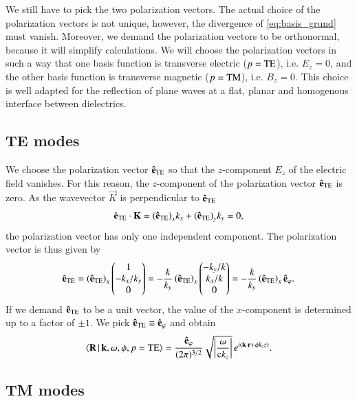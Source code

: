 We still have to pick the two polarization vectors. The actual choice of the
polarization vectors is not unique, however, the divergence of
\eqref{eq:basis_grund} must vanish. Moreover, we demand the polarization
vectors to be orthonormal, because it will simplify calculations. We will
choose the polarization vectors in such a way that one basis function is
transverse electric ($p=\mathrm{TE}$), i.e. $E_z=0$, and the other basis function is
transverse magnetic ($p=\mathrm{TM}$), i.e. $B_z=0$. This choice is well adapted for the
reflection of plane waves at a flat, planar and homogenous interface between
dielectrics.


\subsection{TE modes}

We choose the polarization vector ${\mathbf{\hat e}}_{\mathrm{TE}}$ so that the $z$-component
$E_z$ of the electric field vanishes. For this reason, the $z$-component of the
polarization vector ${\mathbf{\hat e}}_{\mathrm{TE}}$ is zero. As the wavevector $\vec K$ is perpendicular to
${\mathbf{\hat e}}_{\mathrm{TE}}$
\begin{equation}
\hat{{\mathbf{e}}}_{\mathrm{TE}} \cdot{\mathbf{K}} = {\left({\mathbf{\hat e}}_{\mathrm{TE}}\right)}_x k_x + {\left({\mathbf{\hat e}}_{\mathrm{TE}}\right)}_y k_y = 0,
\end{equation}
the polarization vector has only one independent component. The
polarization vector is thus given by
\begin{equation}
\hat{{\mathbf{e}}}_{\mathrm{TE}} = \left({\mathbf{\hat e}}_{\mathrm{TE}}\right)_x \begin{pmatrix} 1 \\ -k_x/k_y \\ 0 \end{pmatrix}
= -\frac{k}{k_y} \left({\mathbf{\hat e}}_{\mathrm{TE}}\right)_x \begin{pmatrix} -k_y/k \\ k_x/k \\ 0 \end{pmatrix}
= -\frac{k}{k_y} \left({\mathbf{\hat e}}_{\mathrm{TE}}\right)_x {\mathbf{\hat e}}_\varphi.
\end{equation}
If we demand ${\mathbf{\hat e}}_{\mathrm{TE}}$ to be a unit vector, the value of the
$x$-component is determined up to a factor of $\pm1$. We pick
${\mathbf{\hat e}}_{\mathrm{TE}} \equiv \hat{{\mathbf{e}}}_\varphi$ and obtain
\begin{equation}
\braket{\vec R \, |\, \vec k, \omega, \phi, p=\TE} %
= \frac{\vec{\hat e}_\varphi}{(2\pi)^{3/2}} \sqrt{\left|\frac{\omega}{\c k_z}\right|} \, \e^{\imag (\vec{k}\cdot\vec r + \phi k_z z)}.
\end{equation}


\subsection{TM modes}

